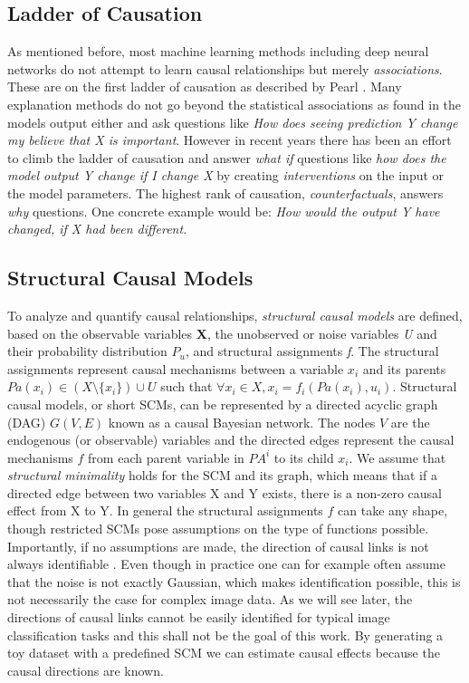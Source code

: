 \subsection{Ladder of Causation}
As mentioned before, most machine learning methods including deep neural networks do not attempt to learn causal relationships but merely \textit{associations}. These are on the first ladder of causation as described by Pearl \cite{Pearl2000}. Many explanation methods do not go beyond the statistical associations as found in the models output either and ask questions like \textit{How does seeing prediction Y change my believe that X is important}. However in recent years there has been an effort to climb the ladder of causation and answer \textit{what if} questions like \textit{how does the model output Y change if I change X} by creating \textit{interventions} on the input or the model parameters. The highest rank of causation, \textit{counterfactuals}, answers \textit{why} questions. One concrete example would be: \textit{How would the output Y have changed, if X had been different}. 

\subsection{Structural Causal Models}
To analyze and quantify causal relationships, \textit{structural causal models} are defined, based on the observable variables \textbf{X}, the unobserved or noise variables \textit{U} and their probability distribution $P_u$, and structural assignments \textit{f}. The structural assignments represent causal mechanisms between a variable $x_i$ and its parents $Pa(x_i) \in (X \setminus \{x_i\}) \cup U$  such that $\forall x_i \in X, x_i = f_i(Pa(x_i),u_i)$. 
Structural causal models, or short SCMs, can be represented by a directed acyclic graph (DAG) $G(V,E)$ known as a causal Bayesian network. The nodes $V$ are the endogenous (or observable) variables and the directed edges represent the causal mechanisms $f$ from each parent variable in $PA^i$ to its child $x_i$. We assume that \textit{structural minimality} holds for the SCM and its graph, which means that if a directed edge between two variables X and Y exists, there is a non-zero causal effect from X to Y. 
In general the structural assignments $f$ can take any shape, though restricted SCMs pose assumptions on the type of functions possible. Importantly, if no assumptions are made, the direction of causal links is not always identifiable \cite{Peters2017}. Even though in practice one can for example often assume that the noise is not exactly Gaussian, which makes identification possible, this is not necessarily the case for complex image data. As we will see later, the directions of causal links cannot be easily identified for typical image classification tasks and this shall not be the goal of this work. By generating a toy dataset with a predefined SCM we can estimate causal effects because the causal directions are known.

